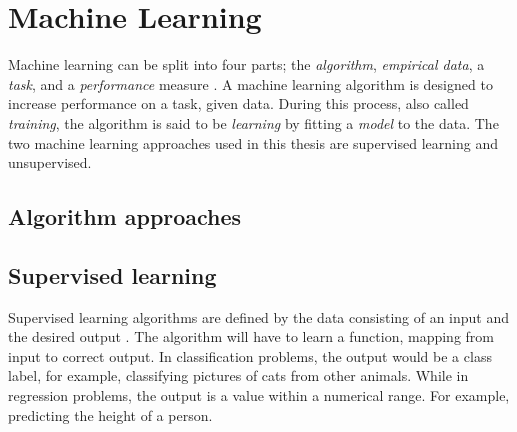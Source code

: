 





\section{Machine Learning} \label{Machine Learning}
    Machine learning can be split into four parts; the \textit{algorithm}, \textit{empirical data}, a \textit{task}, and a \textit{performance} measure \cite{Goodfellow-et-al-2016}. A machine learning algorithm is designed to increase performance on a task, given data. During this process, also called \textit{training}, the algorithm is said to be \textit{learning} by fitting a \textit{model} to the data. The two machine learning approaches used in this thesis are supervised learning and unsupervised\cite{Goodfellow-et-al-2016}. 
    
    \subsection{Algorithm approaches} \label{Algorithm types}
        \subsection{Supervised learning}
            Supervised learning  algorithms are defined by the data consisting of an input and the desired output \cite{Goodfellow-et-al-2016}. The algorithm will have to learn a function, mapping from input to correct output. In classification problems, the output would be a class label, for example, classifying pictures of cats from other animals. While in regression problems, the output is a value within a numerical range. For example, predicting the height of a person.
            

